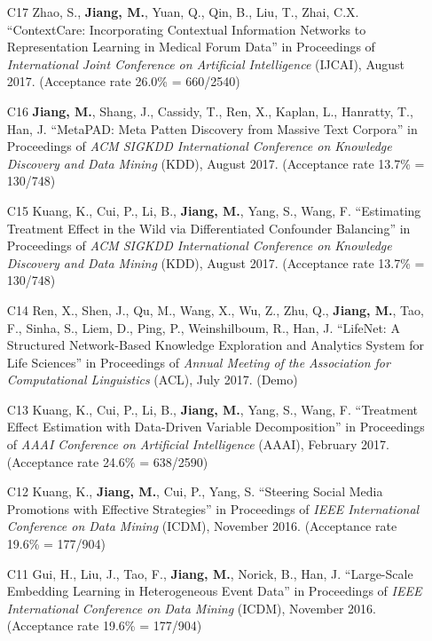 \documentclass[10pt]{article}
\newenvironment{myindentpar}[1]%
{\begin{list}{}%
         {\setlength{\leftmargin}{#1}}%
         \item[]%
}
{\end{list}}
\newcounter{list}
\begin{document}
\begin{myindentpar}{0.00cm}
\begin{enumerate}[leftmargin=.5cm]
\item[C17] Zhao, S., \textbf{Jiang, M.}, Yuan, Q., Qin, B., Liu, T., Zhai, C.X. ``ContextCare: Incorporating Contextual Information Networks to Representation Learning in Medical Forum Data'' in Proceedings of \textit{International Joint Conference on Artificial Intelligence} (IJCAI), August 2017. (Acceptance rate 26.0\% = 660/2540)

\item[C16] \textbf{Jiang, M.}, Shang, J., Cassidy, T., Ren, X., Kaplan, L., Hanratty, T., Han, J. ``MetaPAD: Meta Patten Discovery from Massive Text Corpora'' in Proceedings of \textit{ACM SIGKDD International Conference on Knowledge Discovery and Data Mining} (KDD), August 2017. (Acceptance rate 13.7\% = 130/748)

\item[C15] Kuang, K., Cui, P., Li, B., \textbf{Jiang, M.}, Yang, S., Wang, F. ``Estimating Treatment Effect in the Wild via Differentiated Confounder Balancing'' in Proceedings of \textit{ACM SIGKDD International Conference on Knowledge Discovery and Data Mining} (KDD), August 2017. (Acceptance rate 13.7\% = 130/748)

\item[C14] Ren, X., Shen, J., Qu, M., Wang, X., Wu, Z., Zhu, Q., \textbf{Jiang, M.}, Tao, F., Sinha, S., Liem, D., Ping, P., Weinshilboum, R., Han, J. ``LifeNet: A Structured Network-Based Knowledge Exploration and Analytics System for Life Sciences'' in Proceedings of \textit{Annual Meeting of the Association for Computational Linguistics} (ACL), July 2017. (Demo)

\item[C13] Kuang, K., Cui, P., Li, B., \textbf{Jiang, M.}, Yang, S., Wang, F. ``Treatment Effect Estimation with Data-Driven Variable Decomposition'' in Proceedings of \textit{AAAI Conference on Artificial Intelligence} (AAAI), February 2017. (Acceptance rate 24.6\% = 638/2590)

\item[C12] Kuang, K., \textbf{Jiang, M.}, Cui, P., Yang, S. ``Steering Social Media Promotions with Effective Strategies'' in Proceedings of \textit{IEEE International Conference on Data Mining} (ICDM), November 2016. (Acceptance rate 19.6\% = 177/904)

\item[C11] Gui, H., Liu, J., Tao, F., \textbf{Jiang, M.}, Norick, B., Han, J. ``Large-Scale Embedding Learning in Heterogeneous Event Data'' in Proceedings of \textit{IEEE International Conference on Data Mining} (ICDM), November 2016. (Acceptance rate 19.6\% = 177/904)


\end{enumerate}
\end{myindentpar}
\end{document}
